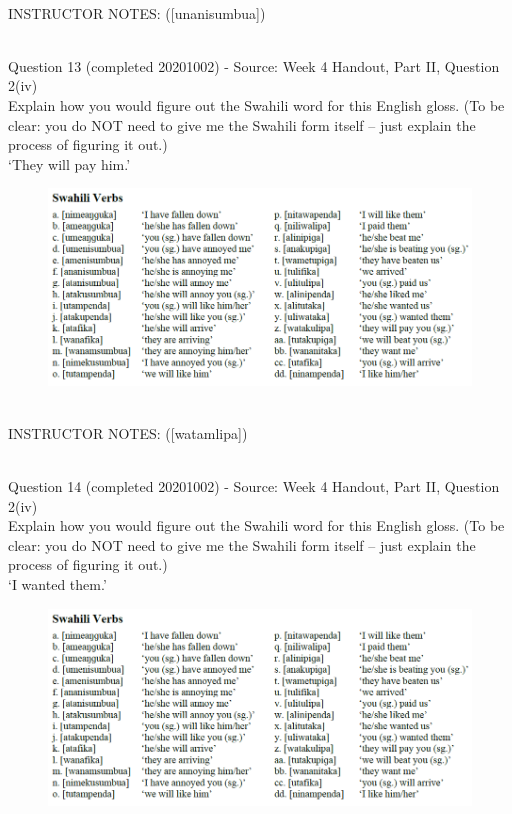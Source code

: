 \documentclass[12pt]{article}
\begin{document}
~\\
INSTRUCTOR NOTES: ([unanisumbua])


~\\

{\large Question 13} (completed 20201002) - Source: Week 4 Handout, Part II, Question 2(iv)\\

Explain how you would figure out the Swahili word for this English gloss. (To be clear: you do NOT need to give me the Swahili form itself -- just explain the process of figuring it out.)\\

‘They will pay him.’

\begin{figure}[H]
\includegraphics{../images/swahiliverbs.png}
\end{figure}

~\\
INSTRUCTOR NOTES: ([watamlipa])


~\\

{\large Question 14} (completed 20201002) - Source: Week 4 Handout, Part II, Question 2(iv)\\

Explain how you would figure out the Swahili word for this English gloss. (To be clear: you do NOT need to give me the Swahili form itself -- just explain the process of figuring it out.)\\

‘I wanted them.’

\begin{figure}[H]
\includegraphics{../images/swahiliverbs.png}
\end{figure}
\end{document}
